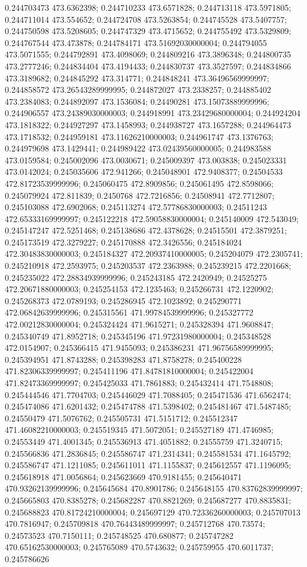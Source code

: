 0.244703473 473.6362398; 0.244710233 473.6571828; 0.244713118 473.5971805; 0.244711014 473.554652; 0.244724708 473.5263854; 0.244745528 473.5407757; 0.244750598 473.5208605; 0.244747329 473.4715652; 0.244755492 473.5329809; 0.244767544 473.473878; 0.244784171 473.51692030000004; 0.244794055 473.5071555; 0.244792891 473.4098069; 0.244809216 473.3896348; 0.244800735 473.2777246; 0.244834404 473.4194433; 0.244830737 473.3527597; 0.244834866 473.3189682; 0.244845292 473.314771; 0.244848241 473.36496569999997; 0.244858572 473.26543289999995; 0.244872027 473.2338257; 0.244885402 473.2384083; 0.244892097 473.1536084; 0.24490281 473.15073889999996; 0.244906557 473.24389030000003; 0.244918991 473.23429680000004; 0.244924204 473.1818322; 0.244927297 473.1458993; 0.244938727 473.1657288; 0.244964473 473.1718532; 0.244959181 473.11626210000003; 0.244961747 473.1376763; 0.244979698 473.1429441; 0.244989422 473.02439560000005; 0.244983588 473.0159584; 0.245002096 473.0030671; 0.245009397 473.003838; 0.245023331 473.0142024; 0.245035606 472.941266; 0.245048901 472.9408377; 0.24504533 472.81723539999996; 0.245060475 472.8909856; 0.245061495 472.8598066; 0.245079924 472.811839; 0.2450768 472.7216856; 0.24508941 472.7712807; 0.245103088 472.6902068; 0.245113274 472.57786830000003; 0.24511243 472.65333169999997; 0.245122218 472.59058830000004; 0.245140009 472.543049; 0.245147247 472.5251468; 0.245138686 472.4378628; 0.24515501 472.3879251; 0.245173519 472.3279227; 0.245170888 472.3426556; 0.245184024 472.30483830000003; 0.245184327 472.20937410000005; 0.245204079 472.2305741; 0.245210918 472.2593975; 0.245203537 472.2363988; 0.245239215 472.2201668; 0.245235022 472.28834939999996; 0.245243185 472.2420949; 0.24525275 472.20671880000003; 0.245254153 472.1235463; 0.245266731 472.1220902; 0.245268373 472.0789193; 0.245286945 472.1023892; 0.245290771 472.06842639999996; 0.245315561 471.99784539999996; 0.245327772 472.00212830000004; 0.245324424 471.9615271; 0.245328394 471.9608847; 0.245340749 471.8952718; 0.245345196 471.97231980000004; 0.245348528 472.0154907; 0.245366415 471.9455093; 0.245386231 471.96756589999995; 0.245394951 471.8743288; 0.245398283 471.8758278; 0.245400228 471.82306339999997; 0.245411196 471.84781810000004; 0.245422004 471.82473369999997; 0.245425033 471.7861883; 0.245432414 471.7548808; 0.245444546 471.7704703; 0.245446029 471.7088405; 0.245471536 471.6562474; 0.245474086 471.6201432; 0.245474788 471.5398402; 0.245481467 471.5487485; 0.24550479 471.5076762; 0.245505731 471.5151712; 0.245512347 471.46082210000003; 0.245519345 471.5072051; 0.245527189 471.4746985; 0.24553449 471.4001345; 0.245536913 471.4051882; 0.24555759 471.3240715; 0.245566836 471.2836845; 0.245586747 471.2314341; 0.245581534 471.1645792; 0.245586747 471.1211085; 0.245611011 471.1155837; 0.245612557 471.1196095; 0.245618918 471.0056864; 0.245623669 470.9181455; 0.245640471 470.93262139999996; 0.245645684 470.8901786; 0.245648155 470.83762839999997; 0.245665803 470.8385278; 0.245682287 470.8821269; 0.245687277 470.8835831; 0.245688823 470.81724210000004; 0.245697129 470.72336260000003; 0.245707013 470.7816947; 0.245709818 470.76443489999997; 0.245712768 470.73574; 0.24573523 470.7150111; 0.245748525 470.680877; 0.245747282 470.65162530000003; 0.245765089 470.5743632; 0.245759955 470.6011737; 0.245786626 